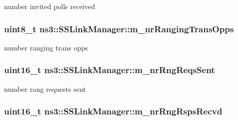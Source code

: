number invited polls received 

\subsubsection[{\texorpdfstring{m\+\_\+nr\+Ranging\+Trans\+Opps}{m_nrRangingTransOpps}}]{\setlength{\rightskip}{0pt plus 5cm}uint8\+\_\+t ns3\+::\+S\+S\+Link\+Manager\+::m\+\_\+nr\+Ranging\+Trans\+Opps\hspace{0.3cm}{\ttfamily [private]}}\hypertarget{classns3_1_1SSLinkManager_a5847dd2b913c5b70cd3a4ea1c9bbb8c4}{}\label{classns3_1_1SSLinkManager_a5847dd2b913c5b70cd3a4ea1c9bbb8c4}


number ranging trans opps 

\subsubsection[{\texorpdfstring{m\+\_\+nr\+Rng\+Reqs\+Sent}{m_nrRngReqsSent}}]{\setlength{\rightskip}{0pt plus 5cm}uint16\+\_\+t ns3\+::\+S\+S\+Link\+Manager\+::m\+\_\+nr\+Rng\+Reqs\+Sent\hspace{0.3cm}{\ttfamily [private]}}\hypertarget{classns3_1_1SSLinkManager_a28fe764252091022ad2f4fc1ae8a0cbc}{}\label{classns3_1_1SSLinkManager_a28fe764252091022ad2f4fc1ae8a0cbc}


number rang requests sent 

\subsubsection[{\texorpdfstring{m\+\_\+nr\+Rng\+Rsps\+Recvd}{m_nrRngRspsRecvd}}]{\setlength{\rightskip}{0pt plus 5cm}uint16\+\_\+t ns3\+::\+S\+S\+Link\+Manager\+::m\+\_\+nr\+Rng\+Rsps\+Recvd\hspace{0.3cm}{\ttfamily [private]}}\hypertarget{classns3_1_1SSLinkManager_a52b9d5b8bc2d27a3ef604735ee731afc}{}\label{classns3_1_1SSLinkManager_a52b9d5b8bc2d27a3ef604735ee731afc}


